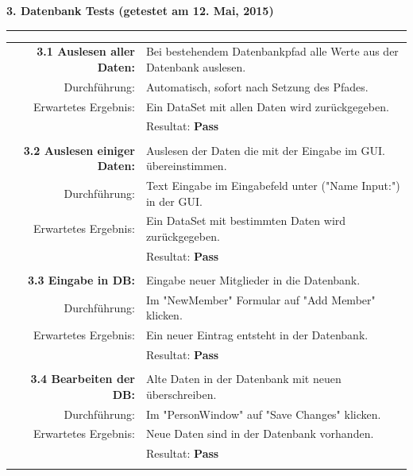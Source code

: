 \documentclass{article}
\begin{document}
\textbf{3. Datenbank Tests (getestet am 12. Mai, 2015)\\}
\rule[2mm]{1\linewidth}{0.3mm}
\begin{tabular}{r|p{12cm}}
	\textbf{3.1 Auslesen aller Daten:} & Bei bestehendem Datenbankpfad alle Werte aus der Datenbank auslesen. \\
		Durchführung:			& Automatisch, sofort nach Setzung des Pfades.\\
		Erwartetes Ergebnis: 	& Ein DataSet mit allen Daten wird zurückgegeben. \\
								& Resultat:  \textbf{Pass}\hspace{7.8cm} \color{green} {\ding{51}} \\
								\\
	\textbf{3.2 Auslesen einiger Daten:} & Auslesen der Daten die mit der Eingabe im GUI. übereinstimmen. \\
		Durchführung:			& Text Eingabe im Eingabefeld unter ("Name Input:") in der GUI.\\
		Erwartetes Ergebnis: 	& Ein DataSet mit bestimmten Daten wird zurückgegeben. \\
								& Resultat:  \textbf{Pass}\hspace{7.8cm} \color{green} {\ding{51}} \\
								\\	
	\textbf{3.3 Eingabe in DB:} & Eingabe neuer Mitglieder in die Datenbank. \\
		Durchführung:			& Im "NewMember" Formular auf "Add Member" klicken.\\
		Erwartetes Ergebnis: 	& Ein neuer Eintrag entsteht in der Datenbank. \\
								& Resultat:  \textbf{Pass}\hspace{7.8cm} \color{green} {\ding{51}} \\
								\\	
		\textbf{3.4 Bearbeiten der DB:} & Alte Daten in der Datenbank mit neuen überschreiben. \\
		Durchführung:			& Im "PersonWindow" auf "Save Changes" klicken.\\
		Erwartetes Ergebnis: 	& Neue Daten sind in der Datenbank vorhanden. \\
								& Resultat:  \textbf{Pass}\hspace{7.8cm} \color{green} {\ding{51}} \\
								\\

\end{tabular}
\end{document}
